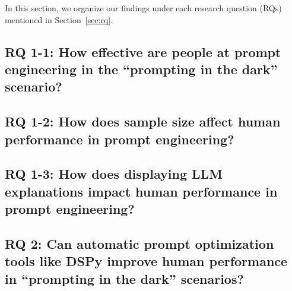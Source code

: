 In this section, we organize our findings under each research question (RQs) mentioned in Section~\ref{sec:rq}.

\subsection{RQ 1-1: How effective are people at prompt engineering in the ``prompting in the dark'' scenario?}



\subsection{RQ 1-2: How does sample size affect human performance in prompt engineering?\label{sec:rq-1-2}}



\subsection{RQ 1-3: How does displaying LLM explanations impact human performance in prompt engineering?\label{sec:llm-explanation-result}}



\subsection{RQ 2: Can automatic prompt optimization tools like DSPy improve human performance in ``prompting in the dark'' scenarios?}












